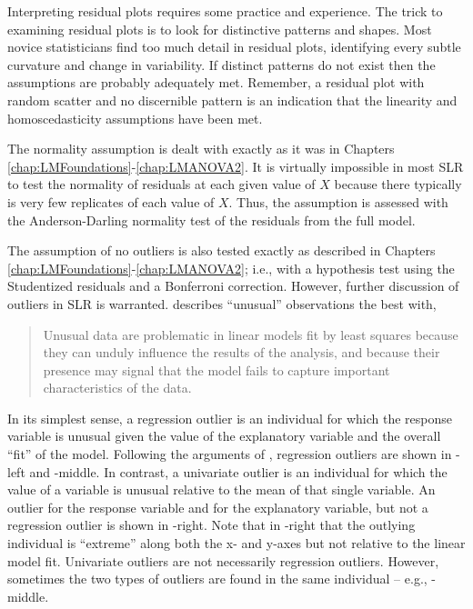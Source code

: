 \documentclass[10pt,openany]{book}\usepackage[]{graphicx}\usepackage[]{color}
\begin{document}

\vspace{-12pt}

Interpreting residual plots requires some practice and experience.  The trick to examining residual plots is to look for distinctive patterns and shapes.  Most novice statisticians find too much detail in residual plots, identifying every subtle curvature and change in variability.  If distinct patterns do not exist then the assumptions are probably adequately met.  Remember, a residual plot with random scatter and no discernible pattern is an indication that the linearity and homoscedasticity assumptions have been met.

The normality assumption is dealt with exactly as it was in Chapters \ref{chap:LMFoundations}-\ref{chap:LMANOVA2}.  It is virtually impossible in most SLR to test the normality of residuals at each given value of $X$ because there typically is very few replicates of each value of $X$.  Thus, the assumption is assessed with the Anderson-Darling normality test of the residuals from the full model.

The assumption of no outliers is also tested exactly as described in Chapters \ref{chap:LMFoundations}-\ref{chap:LMANOVA2}; i.e., with a hypothesis test using the Studentized residuals and a Bonferroni correction.  However, further discussion of outliers in SLR is warranted.  \cite{Fox1997} describes ``unusual'' observations the best with,

\begin{quote}
Unusual data are problematic in linear models fit by least squares because they can unduly influence the results of the analysis, and because their presence may signal that the model fails to capture important characteristics of the data.
\end{quote}

In its simplest sense, a regression outlier is an individual for which the response variable is unusual given the value of the explanatory variable and the overall ``fit'' of the model.  Following the arguments of \cite{Fox1997}, regression outliers are shown in -left and -middle.  In contrast, a univariate outlier is an individual for which the value of a variable is unusual relative to the mean of that single variable.  An outlier for the response variable and for the explanatory variable, but not a regression outlier is shown in -right.  Note that in -right that the outlying individual is ``extreme'' along both the x- and y-axes but not relative to the linear model fit.  Univariate outliers are not necessarily regression outliers.  However, sometimes the two types of outliers are found in the same individual -- e.g., -middle.
\end{document}
